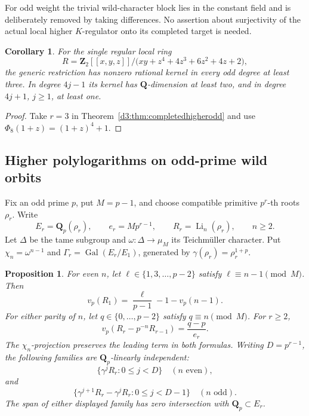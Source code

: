 \documentclass[11pt,a4paper]{amsart}
\numberwithin{equation}{section}
\newtheorem{proposition}[theorem]{Proposition}
\newtheorem{corollary}[theorem]{Corollary}
\theoremstyle{definition}
\theoremstyle{remark}
\newcommand{\Q}{\mathbf Q}
\newcommand{\Z}{\mathbf Z}
\newcommand{\Gal}{\operatorname{Gal}}
\begin{document}
For odd weight the trivial wild-character block lies in the
constant field and is deliberately removed by taking differences.
No assertion about surjectivity of the actual local higher
$K$-regulator onto its completed target is needed.


\begin{corollary}
For the single regular local ring
\[
 R=\Z_2[[x,y,z]]/
 \bigl(xy+z^4+4z^3+6z^2+4z+2\bigr),
\]
the generic restriction has nonzero rational kernel in every
odd degree at least three. In degree $4j-1$ its kernel has
$\Q$-dimension at least two, and in degree $4j+1$, $j\geq1$,
at least one.
\end{corollary}
\begin{proof}
Take $r=3$ in Theorem~\ref{d3:thm:completedhigherodd} and use
$\Phi_8(1+z)=(1+z)^4+1$.
\end{proof}


\subsection{Higher polylogarithms on odd-prime wild orbits}
\label{d3:sec:oddprimehigherwild}

Fix an odd prime $p$, put $M=p-1$, and choose compatible primitive
$p^r$-th roots $\rho_r$. Write
\[
 E_r=\Q_p(\rho_r),\qquad e_r=Mp^{r-1},\qquad
 R_r=\operatorname{Li}_n(\rho_r),\qquad n\geq2.
\]
Let $\Delta$ be the tame subgroup and $\omega:\Delta\to\mu_M$
its Teichm\"uller character. Put $\chi_n=\omega^{n-1}$ and
$\Gamma_r=\Gal(E_r/E_1)$, generated by
$\gamma(\rho_r)=\rho_r^{1+p}$.

\begin{proposition}
\label{d3:prop:oddprimehigherwild}
For even $n$, let $\ell\in\{1,3,\ldots,p-2\}$ satisfy
$\ell\equiv n-1\pmod M$. Then
\begin{equation}\label{d3:eq:oddprimehigherbase}
 v_p(R_1)=\frac{\ell}{p-1}-1-v_p(n-1).
\end{equation}
For either parity of $n$, let $q\in\{0,\ldots,p-2\}$ satisfy
$q\equiv n\pmod M$. For $r\geq2$,
\begin{equation}\label{d3:eq:oddprimehighernew}
 v_p(R_r-p^{-n}R_{r-1})=\frac{q-p}{e_r}.
\end{equation}
The $\chi_n$-projection preserves the leading term in both formulas.
Writing $D=p^{r-1}$, the following families are $\Q_p$-linearly
independent:
\[
 \{\gamma^jR_r:0\leq j<D\}\quad(n\text{ even}),
\]
and
\[
 \{\gamma^{j+1}R_r-\gamma^jR_r:0\leq j<D-1\}
                                  \quad(n\text{ odd}).
\]
The span of either displayed family has zero intersection with
$\Q_p\subset E_r$.
\end{proposition}
\end{document}
